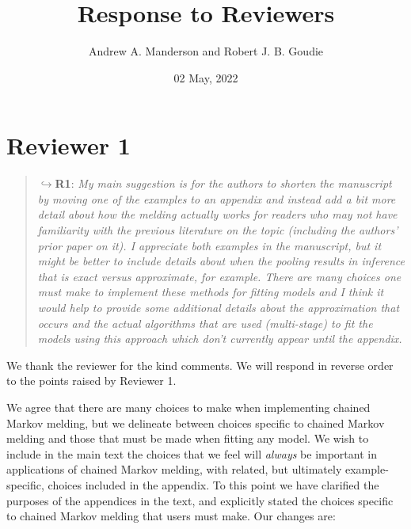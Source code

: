 \documentclass[
  10pt,
  a4paper,
]{article}
\title{Response to Reviewers}
\author{Andrew A. Manderson and Robert J. B. Goudie}
\date{02 May, 2022}
\begin{document}
\maketitle

\hypertarget{reviewer-1}{%
\section*{Reviewer 1}\label{reviewer-1}}

\begin{quote}
\(\hookrightarrow\)\textbf{R1}: \emph{My main suggestion is for the
authors to shorten the manuscript by moving one of the examples to an
appendix and instead add a bit more detail about how the melding
actually works for readers who may not have familiarity with the
previous literature on the topic (including the authors' prior paper on
it). I appreciate both examples in the manuscript, but it might be
better to include details about when the pooling results in inference
that is exact versus approximate, for example. There are many choices
one must make to implement these methods for fitting models and I think
it would help to provide some additional details about the approximation
that occurs and the actual algorithms that are used (multi-stage) to fit
the models using this approach which don't currently appear until the
appendix.}
\end{quote}

We thank the reviewer for the kind comments. We will respond in reverse
order to the points raised by Reviewer 1.

We agree that there are many choices to make when implementing chained
Markov melding, but we delineate between choices specific to chained
Markov melding and those that must be made when fitting any model. We
wish to include in the main text the choices that we feel will
\emph{always} be important in applications of chained Markov melding,
with related, but ultimately example-specific, choices included in the
appendix. To this point we have clarified the purposes of the appendices
in the text, and explicitly stated the choices specific to chained
Markov melding that users must make. Our changes are:
\end{document}
